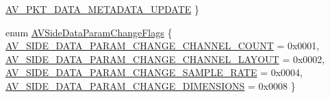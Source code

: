 \begin{DoxyCompactItemize}
\hyperlink{group__lavc__packet_gga9a80bfcacc586b483a973272800edb97a8f5f41fa3f854d68604ed81950bc8ee9}{A\+V\+\_\+\+P\+K\+T\+\_\+\+D\+A\+T\+A\+\_\+\+M\+E\+T\+A\+D\+A\+T\+A\+\_\+\+U\+P\+D\+A\+TE}
 \}
\item 
enum \hyperlink{group__lavc__packet_ga437bfa981d4c8968ca92f41ecbcb8054}{A\+V\+Side\+Data\+Param\+Change\+Flags} \{ \hyperlink{group__lavc__packet_gga437bfa981d4c8968ca92f41ecbcb8054a18ac29a4e928b1ef8eff4893ae70073c}{A\+V\+\_\+\+S\+I\+D\+E\+\_\+\+D\+A\+T\+A\+\_\+\+P\+A\+R\+A\+M\+\_\+\+C\+H\+A\+N\+G\+E\+\_\+\+C\+H\+A\+N\+N\+E\+L\+\_\+\+C\+O\+U\+NT} = 0x0001, 
\hyperlink{group__lavc__packet_gga437bfa981d4c8968ca92f41ecbcb8054a1afb2793dfb14b0db3caca605b2baabc}{A\+V\+\_\+\+S\+I\+D\+E\+\_\+\+D\+A\+T\+A\+\_\+\+P\+A\+R\+A\+M\+\_\+\+C\+H\+A\+N\+G\+E\+\_\+\+C\+H\+A\+N\+N\+E\+L\+\_\+\+L\+A\+Y\+O\+UT} = 0x0002, 
\hyperlink{group__lavc__packet_gga437bfa981d4c8968ca92f41ecbcb8054ac0fd6e147f7e6ebe14002f95594e5317}{A\+V\+\_\+\+S\+I\+D\+E\+\_\+\+D\+A\+T\+A\+\_\+\+P\+A\+R\+A\+M\+\_\+\+C\+H\+A\+N\+G\+E\+\_\+\+S\+A\+M\+P\+L\+E\+\_\+\+R\+A\+TE} = 0x0004, 
\hyperlink{group__lavc__packet_gga437bfa981d4c8968ca92f41ecbcb8054af1a5e3b694261807e0ed9032b424c165}{A\+V\+\_\+\+S\+I\+D\+E\+\_\+\+D\+A\+T\+A\+\_\+\+P\+A\+R\+A\+M\+\_\+\+C\+H\+A\+N\+G\+E\+\_\+\+D\+I\+M\+E\+N\+S\+I\+O\+NS} = 0x0008
 \}
\end{DoxyCompactItemize}
